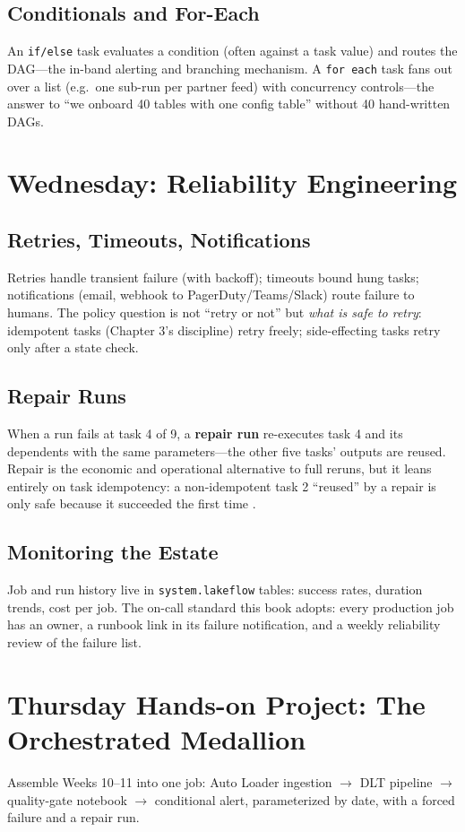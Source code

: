 \subsection{Conditionals and For-Each}
An \texttt{if/else} task evaluates a condition (often against a task value) and routes the DAG---the in-band alerting and branching mechanism. A \texttt{for each} task fans out over a list (e.g.\ one sub-run per partner feed) with concurrency controls---the answer to ``we onboard 40 tables with one config table'' without 40 hand-written DAGs.

\section{Wednesday: Reliability Engineering}
\subsection{Retries, Timeouts, Notifications}
Retries handle transient failure (with backoff); timeouts bound hung tasks; notifications (email, webhook to PagerDuty/Teams/Slack) route failure to humans. The policy question is not ``retry or not'' but \emph{what is safe to retry}: idempotent tasks (Chapter 3's discipline) retry freely; side-effecting tasks retry only after a state check.

\subsection{Repair Runs}
When a run fails at task 4 of 9, a \textbf{repair run} re-executes task 4 and its dependents with the same parameters---the other five tasks' outputs are reused. Repair is the economic and operational alternative to full reruns, but it leans entirely on task idempotency: a non-idempotent task 2 ``reused'' by a repair is only safe because it succeeded the first time \cite{databricksJobsAPI}.

\subsection{Monitoring the Estate}
Job and run history live in \texttt{system.lakeflow} tables: success rates, duration trends, cost per job. The on-call standard this book adopts: every production job has an owner, a runbook link in its failure notification, and a weekly reliability review of the failure list.

\section{Thursday Hands-on Project: The Orchestrated Medallion}
Assemble Weeks 10--11 into one job: Auto Loader ingestion $\rightarrow$ DLT pipeline $\rightarrow$ quality-gate notebook $\rightarrow$ conditional alert, parameterized by date, with a forced failure and a repair run.

